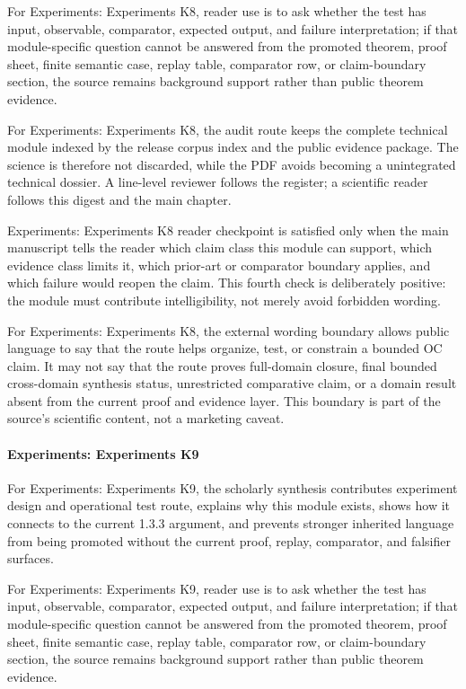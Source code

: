 For Experiments: Experiments K8, reader use is to ask whether the test has input, observable, comparator, expected output, and failure interpretation; if that module-specific question cannot be answered from the promoted theorem, proof sheet, finite semantic case, replay table, comparator row, or claim-boundary section, the source remains background support rather than public theorem evidence.


For Experiments: Experiments K8, the audit route keeps the complete technical module indexed by the release corpus index and the public evidence package. The science is therefore not discarded, while the PDF avoids becoming a unintegrated technical dossier. A line-level reviewer follows the register; a scientific reader follows this digest and the main chapter.


Experiments: Experiments K8 reader checkpoint is satisfied only when the main manuscript tells the reader which claim class this module can support, which evidence class limits it, which prior-art or comparator boundary applies, and which failure would reopen the claim. This fourth check is deliberately positive: the module must contribute intelligibility, not merely avoid forbidden wording.


For Experiments: Experiments K8, the external wording boundary allows public language to say that the route helps organize, test, or constrain a bounded OC claim. It may not say that the route proves full-domain closure, final bounded cross-domain synthesis status, unrestricted comparative claim, or a domain result absent from the current proof and evidence layer. This boundary is part of the source's scientific content, not a marketing caveat.


\paragraph{Experiments: Experiments K9}

For Experiments: Experiments K9, the scholarly synthesis contributes experiment design and operational test route, explains why this module exists, shows how it connects to the current 1.3.3 argument, and prevents stronger inherited language from being promoted without the current proof, replay, comparator, and falsifier surfaces.


For Experiments: Experiments K9, reader use is to ask whether the test has input, observable, comparator, expected output, and failure interpretation; if that module-specific question cannot be answered from the promoted theorem, proof sheet, finite semantic case, replay table, comparator row, or claim-boundary section, the source remains background support rather than public theorem evidence.


